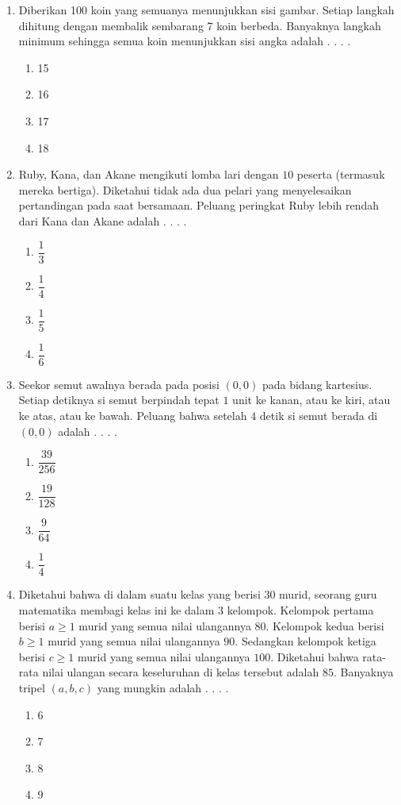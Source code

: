 \documentclass[12pt]{scrartcl}
\begin{document}
\begin{enumerate}[label={Soal \arabic*}]
    \item Diberikan 100 koin yang semuanya menunjukkan sisi gambar. Setiap langkah dihitung dengan membalik sembarang 7 koin berbeda. Banyaknya langkah minimum sehingga semua koin menunjukkan sisi angka adalah . . . .
    \begin{enumerate}[label={(\Alph*)}]
        \item 15 \item 16 \item 17 \item 18
    \end{enumerate}

    \item Ruby, Kana, dan Akane mengikuti lomba lari dengan $10$ peserta (termasuk mereka bertiga). Diketahui tidak ada dua pelari yang menyelesaikan pertandingan pada saat bersamaan. Peluang peringkat Ruby lebih rendah dari Kana dan Akane adalah . . . .
    \begin{enumerate}[label={(\Alph*)}]
        \item $\dfrac{1}{3}$ \item $\dfrac{1}{4}$ \item $\dfrac{1}{5}$ \item $\dfrac{1}{6}$
    \end{enumerate}

    \item Seekor semut awalnya berada pada posisi $(0, 0)$ pada bidang kartesius. Setiap detiknya si semut berpindah tepat $1$ unit ke kanan, atau ke kiri, atau ke atas, atau ke bawah. Peluang bahwa setelah $4$ detik si semut berada di $(0, 0)$ adalah . . . .
    \begin{enumerate}[label={(\Alph*)}]
        \item $\dfrac{39}{256}$ \item $\dfrac{19}{128}$ \item $\dfrac{9}{64}$ \item $\dfrac{1}{4}$
    \end{enumerate}

    \item Diketahui bahwa di dalam suatu kelas yang berisi $30$ murid, seorang guru matematika membagi kelas ini ke dalam 3 kelompok. Kelompok pertama berisi $a\ge 1$ murid yang semua nilai ulangannya $80$. Kelompok kedua berisi $b\ge 1$ murid yang semua nilai ulangannya $90$. Sedangkan kelompok ketiga berisi $c\ge 1$ murid yang semua nilai ulangannya $100$. Diketahui bahwa rata-rata nilai ulangan secara keseluruhan di kelas tersebut adalah $85$. Banyaknya tripel $(a,b,c)$ yang mungkin adalah . . . .
    \begin{enumerate}[label={(\Alph*)}]
        \item 6 \item 7 \item 8 \item 9
    \end{enumerate}


\end{enumerate}
\end{document}
